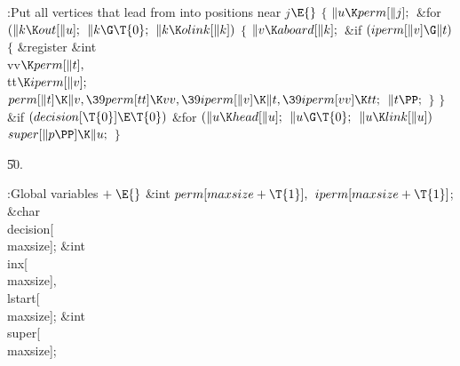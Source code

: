 \B{}:Put all vertices that lead from 
into positions near $j$\X${}\E{}$\6
${}\{{}$\1\6
${}\|u\K\\{perm}[\|j];{}$\6
\&{for} ${}(\|k\K\\{out}[\|u];{}$ ${}\|k\G\T{0};{}$ ${}\|k\K\\{olink}[\|k]){}$\5
${}\{{}$\1\6
${}\|v\K\\{aboard}[\|k];{}$\6
\&{if} ${}(\\{iperm}[\|v]\G\|t){}$\5
${}\{{}$\1\6
\&{register} \&{int} \\{vv}${}\K\\{perm}[\|t],{}$ \\{tt}${}\K\\{iperm}[\|v];{}$%
\7
${}\\{perm}[\|t]\K\|v,\39\\{perm}[\\{tt}]\K\\{vv},\39\\{iperm}[\|v]\K\|t,\39%
\\{iperm}[\\{vv}]\K\\{tt};{}$\6
${}\|t\PP;{}$\6
\4${}\}{}$\2\6
\4${}\}{}$\2\6
\&{if} ${}(\\{decision}[\T{0}]\E\T{0}){}$\1\6
\&{for} ${}(\|u\K\\{head}[\|u];{}$ ${}\|u\G\T{0};{}$ ${}\|u\K\\{link}[\|u]){}$%
\1\5
${}\\{super}[\|p\PP]\K\|u;{}$\2\2\6
\4${}\}{}$\2\par
\U50.\fi

\B{}:Global variables\X${}\mathrel+\E{}$\6
\&{int} ${}\\{perm}[\\{maxsize}+\T{1}],{}$ ${}\\{iperm}[\\{maxsize}+\T{1}]{}$;%
\6
\&{char} \\{decision}[\\{maxsize}];\6
\&{int} \\{inx}[\\{maxsize}]${},{}$ \\{lstart}[\\{maxsize}];\6
\&{int} \\{super}[\\{maxsize}];\par
\fi

